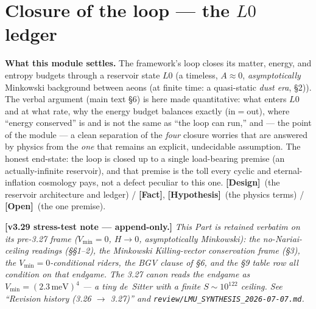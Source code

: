 \documentclass[11pt]{article}
\newcommand{\Fact}{\textbf{\textcolor{green!45!black}{[Fact]}}}
\newcommand{\Hyp}{\textbf{\textcolor{blue!55!black}{[Hypothesis]}}}
\newcommand{\Design}{\textbf{\textcolor{purple!65!black}{[Design]}}}
\newcommand{\Open}{\textbf{\textcolor{gray!10!black}{[Open]}}}
\begin{document}
\clearpage

\part{Closure of the loop --- the $L0$ ledger}
\setcounter{section}{0}\setcounter{equation}{0}\setcounter{figure}{0}

\noindent\textbf{What this module settles.} The framework's loop closes its matter, energy, and entropy budgets through a reservoir state $L0$ (a timeless, $A\!\approx\!0$, \emph{asymptotically} Minkowski background between aeons (at finite time: a quasi-static \emph{dust era}, \S2)). The verbal argument (main text \S6) is here made quantitative: what enters $L0$ and at what rate, why the energy budget balances exactly (in$=$out), where ``energy conserved'' is and is not the same as ``the loop can run,'' and --- the point of the module --- a clean separation of the \emph{four} closure worries that are answered by physics from the \emph{one} that remains an explicit, undecidable assumption. The honest end-state: the loop is closed up to a single load-bearing premise (an actually-infinite reservoir), and that premise is the toll every cyclic and eternal-inflation cosmology pays, not a defect peculiar to this one. \Design\ (the reservoir architecture and ledger) / \Fact, \Hyp\ (the physics terms) / \Open\ (the one premise).

\noindent\textbf{[v3.29 stress-test note --- append-only.]} \emph{This Part is retained verbatim on its pre-3.27 frame ($V_{\min}=0$, $H\to0$, asymptotically Minkowski): the no-Nariai-ceiling readings (\S\S1--2), the Minkowski Killing-vector conservation frame (\S3), the $V_{\min}=0$-conditional riders, the BGV clause of \S6, and the \S9 table row all condition on that endgame. The 3.27 canon reads the endgame as $V_{\min}=(2.3\,\mathrm{meV})^4$ --- a tiny de~Sitter with a finite $S\sim10^{122}$ ceiling. See ``Revision history (3.26 $\to$ 3.27)'' and \texttt{review/LMU\_SYNTHESIS\_2026-07-07.md}.}
\end{document}
